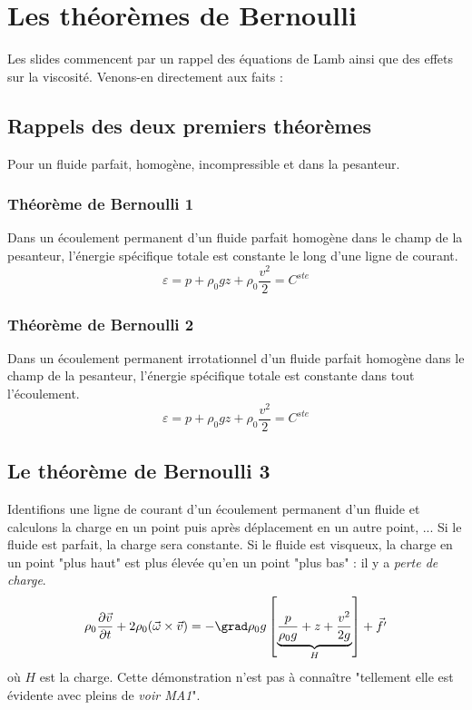 	
	
\section{Les théorèmes de Bernoulli}
Les slides commencent par un rappel des équations de Lamb ainsi que des effets sur la viscosité.
Venons-en directement aux faits :
	
	\subsection{Rappels des deux premiers théorèmes}
	Pour un fluide parfait, homogène, incompressible et dans la pesanteur.
	
		\subsubsection{Théorème de Bernoulli 1}
		Dans un écoulement permanent d'un fluide parfait homogène dans le champ de la pesanteur, 
		l'énergie spécifique totale est constante le long d'une ligne de courant.
		\begin{equation}
		\varepsilon = p + \rho_0gz + \rho_0\frac{v^2}{2} = C^{ste}
		\end{equation}
		
		\subsubsection{Théorème de Bernoulli 2}
		Dans un écoulement permanent irrotationnel d'un fluide parfait homogène dans le champ de 
		la pesanteur, l'énergie spécifique totale est constante dans tout l'écoulement.
		\begin{equation}
		\varepsilon = p + \rho_0gz + \rho_0\frac{v^2}{2} = C^{ste}
		\end{equation}
		
	\subsection{Le théorème de Bernoulli 3}
	Identifions une ligne de courant d'un écoulement permanent d'un fluide et calculons la charge en
	un point puis après déplacement en un autre point, ... Si le fluide est parfait, la charge sera
	constante. Si le fluide est visqueux, la charge en un point "plus haut" est plus élevée qu'en 
	un point "plus bas" : il y a \textit{perte de charge}.
	\begin{equation}
	\rho_0\dfrac{\partial \vec{v}}{\partial t} + 2\rho_0(\vec{\omega}\times\vec{v}) = -\grad \rho_0g
	\left[\underbrace{\dfrac{p}{\rho_0g}+z+\dfrac{v^2}{2g}}_{H}\right] + \vec{f'}
	\end{equation}
	où $H$ est la charge. Cette démonstration n'est pas à connaître "tellement elle est évidente avec 
	pleins de \textit{voir MA1}".\\
		
